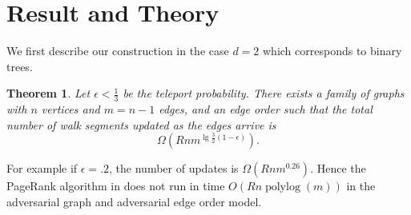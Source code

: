 \documentclass{article}
\newcommand{\pn}[1]{\left( #1 \right)}
\newtheorem{thm}{Theorem}
\DeclareMathOperator{\polylog}{polylog}
\begin{document}
\section{Result and Theory}
We first describe our construction in the case $d=2$ which corresponds to binary trees.
\begin{thm} Let $\epsilon < \frac{1}{3}$ be the teleport probability.  There exists a family of graphs with $n$ vertices and $m=n-1$ edges, and an edge order such that the total number of walk segments updated as the edges arrive is 
\[\Omega \pn{R n m^{\lg{\frac{3}{2}(1-\epsilon)}}}.\]
\end{thm}
For example if $\epsilon=.2$, the number of updates is $\Omega \pn{Rn m^{0.26}}$.  Hence the PageRank algorithm in \cite{incremental_pagerank} does not run in time  $O(R n \polylog(m))$ in the adversarial graph and adversarial edge order model.
\end{document}

